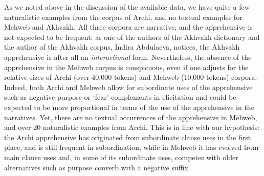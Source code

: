 \documentclass[output=paper,colorlinks,citecolor=brown]{langscibook}
\begin{document}
As we noted above in the discussion of the available data, we have quite a few naturalistic examples from the corpus of Archi, and no textual examples for Mehweb and Akhvakh. All three corpora are narrative, and the apprehensive is not expected to be frequent: as one of the authors of the Akhvakh dictionary and the author of the Akhvakh corpus, Indira Abdulaeva, notices, the Akhvakh apprehensive is after all an \textit{interactional} form. Nevertheless, the absence of the apprehensive in the Mehweb corpus is conspicuous, even if one adjusts for the relative sizes of Archi (over 40,000 tokens) and Mehweb (10,000 tokens) corpora. Indeed, both Archi and Mehweb allow for subordinate uses of the apprehensive such as negative purpose or `fear' complements in elicitation and could be expected to be more proportional in terms of the use of the apprehensive in the narratives. Yet, there are no textual occurrences of the apprehensive in Mehweb, and over 20 naturalistic examples from Archi. This is in line with our hypothesis: the Archi apprehensive has originated from subordinate clause uses in the first place, and is still frequent in subordination, while in Mehweb it has evolved from main clause uses and, in some of its subordinate uses, competes with older alternatives such as purpose converb with a negative suffix.
\end{document}
